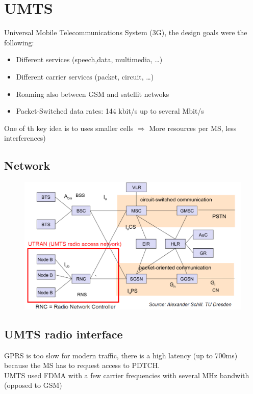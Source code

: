 
\section{UMTS}
Universal Mobile Telecommunications System (3G), the design goals were the following:
\begin{itemize}
	\item Different services (speech,data, multimedia, \ldots)
	\item Different carrier services (packet, circuit, \ldots)
	\item Roaming also between GSM and satellit netwoks
	\item Packet-Switched data rates: 144 kbit/s up to several
	Mbit/s
\end{itemize}
One of th key idea is to uses smaller cells $\Rightarrow$ More resources per MS,
less interferences)
\subsection{Network}
\begin{figure}
	\centering
	\includegraphics[scale=0.5]{img/umts.png}
\end{figure}
\subsection{UMTS radio interface}
GPRS is too slow for modern traffic, there is a high latency (up to 700ms) 
because the MS has to request access to PDTCH.\\
UMTS used FDMA with a few carrier frequencies with several MHz bandwith
(opposed to GSM)
